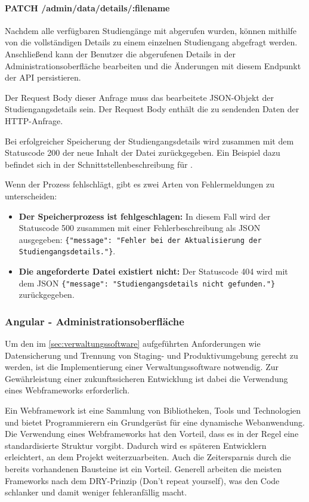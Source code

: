 \paragraph*{PATCH /admin/data/details/:filename}
\vspace{-1.0em}
Nachdem alle verfügbaren Studiengänge mit  abgerufen wurden, können mithilfe von  die vollständigen Details zu einem einzelnen Studiengang abgefragt werden. Anschließend kann der Benutzer die abgerufenen Details in der Administrationsoberfläche bearbeiten und die Änderungen mit diesem Endpunkt der API persistieren.

Der Request Body dieser Anfrage muss das bearbeitete JSON-Objekt der Studiengangsdetails sein. Der Request Body enthält die zu sendenden Daten der HTTP-Anfrage. \parencite{parthiban_essential_2023}

Bei erfolgreicher Speicherung der Studiengangsdetails wird zusammen mit dem Statuscode 200 der neue Inhalt der Datei zurückgegeben. Ein Beispiel dazu befindet sich in der Schnittstellenbeschreibung für .

\noindent
Wenn der Prozess fehlschlägt, gibt es zwei Arten von Fehlermeldungen zu unterscheiden:
\begin{itemize}
    \item \textbf{Der Speicherprozess ist fehlgeschlagen:} In diesem Fall wird der Statuscode 500 zusammen mit einer Fehlerbeschreibung als JSON ausgegeben: \lstinline[style=python]|{"message": "Fehler bei der Aktualisierung der Studiengangsdetails."}|.
    \item \textbf{Die angeforderte Datei  existiert nicht:} Der Statuscode 404 wird mit dem JSON \lstinline[style=python]|{"message": "Studiengangsdetails nicht gefunden."}| zurückgegeben. 
\end{itemize}

\subsubsection{Angular - Administrationsoberfläche}
Um den im \autoref{sec:verwaltungssoftware} aufgeführten Anforderungen wie Datensicherung und Trennung von Staging- und Produktivumgebung gerecht zu werden, ist die Implementierung einer Verwaltungssoftware notwendig. Zur Gewährleistung einer zukunftssicheren Entwicklung ist dabei die Verwendung eines Webframeworks erforderlich.

Ein Webframework ist eine Sammlung von Bibliotheken, Tools und Technologien und bietet Programmierern ein Grundgerüst für eine dynamische Webanwendung. Die Verwendung eines Webframeworks hat den Vorteil, dass es in der Regel eine standardisierte Struktur vorgibt. Dadurch wird es späteren Entwicklern erleichtert, an dem Projekt weiterzuarbeiten. Auch die Zeitersparnis durch die bereits vorhandenen Bausteine ist ein Vorteil. Generell arbeiten die meisten Frameworks nach dem DRY-Prinzip (Don't repeat yourself), was den Code schlanker und damit weniger fehleranfällig macht.
\parencite{domainfactory_beliebtesten_2023}

